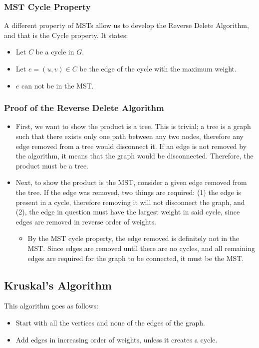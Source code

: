 \documentclass[10pt]{article}
\begin{document}
\subsubsection*{MST Cycle Property}
A different property of MSTs allow us to develop the Reverse Delete Algorithm, and that is the Cycle property.  It states:
\begin{itemize}
	\item Let $C$ be a cycle in $G$.
	\item Let $e = (u, v) \in C$ be the edge of the cycle with the maximum weight.
	\item $e$ can not be in the MST.
\end{itemize}

\subsubsection*{Proof of the Reverse Delete Algorithm}
\begin{itemize}
	\item First, we want to show the product is a tree.  This is trivial; a tree is a graph such that there exists only one path between any two nodes, therefore any edge removed from a tree would disconnect it.  If an edge is not removed by the algorithm, it means that the graph would be disconnected. Therefore, the product must be a tree.
	\item Next, to show the product is the MST, consider a given edge removed from the tree.  If the edge was removed, two things are required: (1) the edge is present in a cycle, therefore removing it will not disconnect the graph, and (2), the edge in question must have the largest weight in said cycle, since edges are removed in reverse order of weights.
	\begin{itemize}
	    \item By the MST cycle property, the edge removed is definitely not in the MST.  Since edges are removed until there are no cycles, and all remaining edges are required for the graph to be connected, it must be the MST.
    \end{itemize}
\end{itemize}

\subsection*{Kruskal's Algorithm}
This algorithm goes as follows:
\begin{itemize}
	\item Start with all the vertices and none of the edges of the graph.
	\item Add edges in increasing order of weights, unless it creates a cycle.
\end{itemize}
\end{document}

